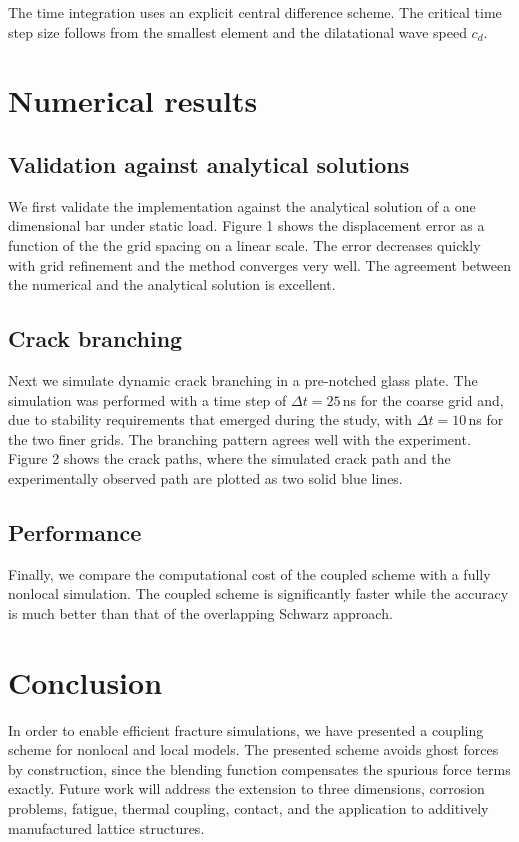 \documentclass{article}
\begin{document}
The time integration uses an explicit central difference scheme. The critical
time step size follows from the smallest element and the dilatational wave
speed $c_d$.

\section{Numerical results}

\subsection{Validation against analytical solutions}

We first validate the implementation against the analytical solution of a
one dimensional bar under static load. Figure 1 shows the displacement error
as a function of the the grid spacing on a linear scale. The error decreases
quickly with grid refinement and the method converges very well. The
agreement between the numerical and the analytical solution is excellent.

\subsection{Crack branching}

Next we simulate dynamic crack branching in a pre-notched glass plate. The
simulation was performed with a time step of $\Delta t = 25\,$ns for the
coarse grid and, due to stability requirements that emerged during the
study, with $\Delta t = 10\,$ns for the two finer grids. The branching
pattern agrees well with the experiment. Figure 2 shows the crack paths,
where the simulated crack path and the experimentally observed path are
plotted as two solid blue lines.

\subsection{Performance}

Finally, we compare the computational cost of the coupled scheme with a
fully nonlocal simulation. The coupled scheme is significantly faster while
the accuracy is much better than that of the overlapping Schwarz approach.

\section{Conclusion}

In order to enable efficient fracture simulations, we have presented a
coupling scheme for nonlocal and local models. The presented scheme avoids
ghost forces by construction, since the blending function compensates the
spurious force terms exactly. Future work will address the extension to
three dimensions, corrosion problems, fatigue, thermal coupling, contact,
and the application to additively manufactured lattice structures.
\end{document}
